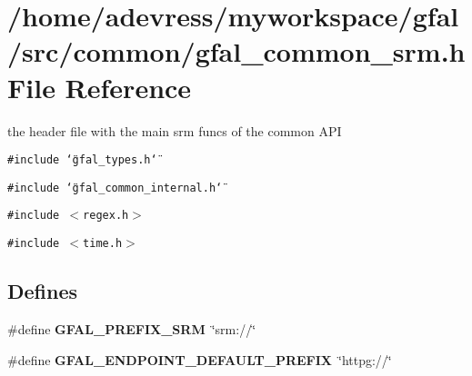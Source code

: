 \section{/home/adevress/myworkspace/gfal/src/common/gfal\_\-common\_\-srm.h File Reference}
\label{gfal__common__srm_8h}
the header file with the main srm funcs of the common API 

{\tt \#include \char`\"{}gfal\_\-types.h\char`\"{}}\par
{\tt \#include \char`\"{}gfal\_\-common\_\-internal.h\char`\"{}}\par
{\tt \#include $<$regex.h$>$}\par
{\tt \#include $<$time.h$>$}\par
\subsection*{Defines}
\begin{CompactItemize}
\item 
\#define \textbf{GFAL\_\-PREFIX\_\-SRM}~\char`\"{}srm://\char`\"{}\label{gfal__common__srm_8h_c163cc407dc64638a5f13fe1d7ceb858}

\item 
\#define \textbf{GFAL\_\-ENDPOINT\_\-DEFAULT\_\-PREFIX}~\char`\"{}httpg://\char`\"{}\label{gfal__common__srm_8h_496c8a18054866dcb27ae3f3397ac303}

\end{CompactItemize}
